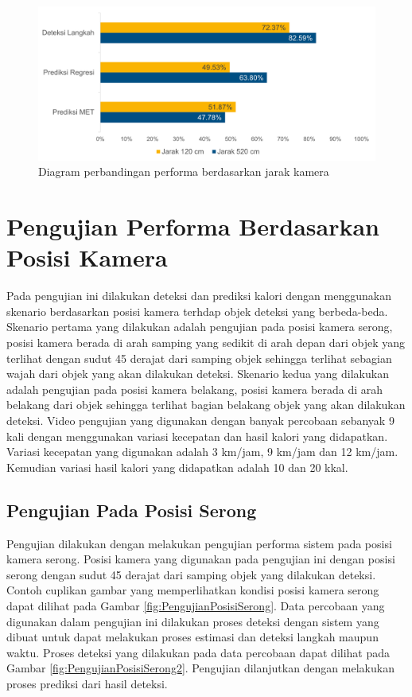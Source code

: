 \begin{figure}[H]
  \centering
  \includegraphics[scale=0.7]{gambar/diagram_jarak.png}
  \caption{Diagram perbandingan performa berdasarkan jarak kamera}
  \label{fig:DiagramJarak}
\end{figure}

\section{Pengujian Performa Berdasarkan Posisi Kamera}
\label{sec:PengujianPosisi}

Pada pengujian ini dilakukan deteksi dan prediksi kalori dengan menggunakan skenario berdasarkan posisi kamera terhdap objek deteksi yang berbeda-beda. Skenario pertama yang dilakukan adalah pengujian pada posisi kamera serong, posisi kamera berada di arah samping yang sedikit di arah depan dari objek yang terlihat dengan sudut 45 derajat dari samping objek sehingga terlihat sebagian wajah dari objek yang akan dilakukan deteksi. Skenario kedua yang dilakukan adalah pengujian pada posisi kamera belakang, posisi kamera berada di arah belakang dari objek sehingga terlihat bagian belakang objek yang akan dilakukan deteksi. Video pengujian yang digunakan dengan banyak percobaan sebanyak 9 kali dengan menggunakan variasi kecepatan dan hasil kalori yang didapatkan. Variasi kecepatan yang digunakan adalah 3 km/jam, 9 km/jam dan 12 km/jam. Kemudian variasi hasil kalori yang didapatkan adalah 10 dan 20 kkal. 


\subsection{Pengujian Pada Posisi Serong}
\label{subsec:PengujianPosisiSerong}

Pengujian dilakukan dengan melakukan pengujian performa sistem pada posisi kamera serong. Posisi kamera yang digunakan pada pengujian ini dengan posisi serong dengan sudut 45 derajat dari samping objek yang dilakukan deteksi. Contoh cuplikan gambar yang memperlihatkan kondisi posisi kamera serong dapat dilihat pada Gambar \ref{fig:PengujianPosisiSerong}. Data percobaan yang digunakan dalam pengujian ini dilakukan proses deteksi dengan sistem yang dibuat untuk dapat melakukan proses estimasi dan deteksi langkah maupun waktu. Proses deteksi yang dilakukan pada data percobaan dapat dilihat pada Gambar \ref{fig:PengujianPosisiSerong2}. Pengujian dilanjutkan dengan melakukan proses prediksi dari hasil deteksi.




